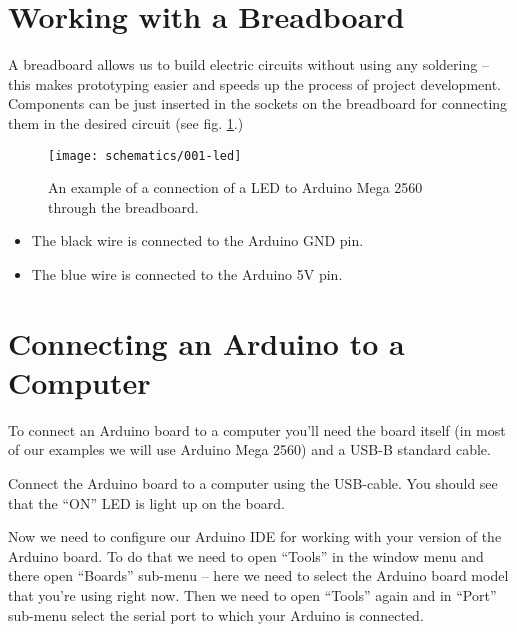 \documentclass[../sparc.tex]{subfiles}
\begin{document}
\section{Working with a Breadboard}


A breadboard allows us to build electric circuits without using any soldering --
this makes prototyping easier and speeds up the process of project development.
Components can be just inserted in the sockets on the breadboard for connecting
them in the desired circuit (see fig. \ref{fig:breadboard-led}.)

\begin{figure}[ht]
  \centering
  \texttt{[image: schematics/001-led]}
  \caption{An example of a connection of a LED to Arduino Mega 2560 through the
    breadboard.}
  \label{fig:breadboard-led}
\end{figure}

\begin{itemize}
\item The black wire is connected to the Arduino GND pin.
\item The blue wire is connected to the Arduino 5V pin.
\end{itemize}


\section{Connecting an Arduino to a Computer}
To connect an Arduino board to a computer you'll need the board itself (in most
of our examples we will use Arduino Mega 2560) and a USB-B standard cable.

Connect the Arduino board to a computer using the USB-cable.  You should see
that the ``ON'' LED is light up on the board.

Now we need to configure our Arduino \gls{IDE} for working with your version of
the Arduino board.  To do that we need to open ``Tools'' in the window menu and
there open ``Boards'' sub-menu -- here we need to select the Arduino board model
that you're using right now.  Then we need to open ``Tools'' again and in
``Port'' sub-menu select the serial port to which your Arduino is connected.
\end{document}
